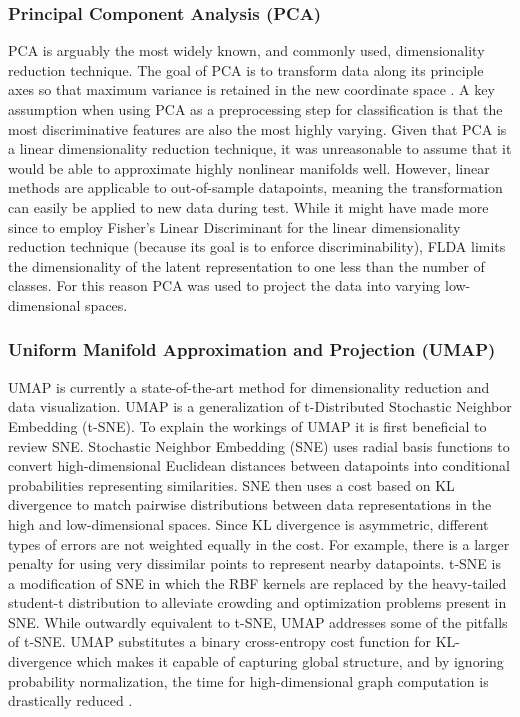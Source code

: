\documentclass[conference]{IEEEtran}
\begin{document}
	\subsubsection*{Principal Component Analysis (PCA)}  PCA is arguably the most widely known, and commonly used, dimensionality reduction technique.  The goal of PCA is to transform data along its principle axes so that maximum variance is retained in the new coordinate space \cite{Tipping1999PPCA,Murphy2012Textbook}.  A key assumption when using PCA as a preprocessing step for classification is that the most discriminative features are also the most highly varying. Given that PCA is a linear dimensionality reduction technique, it was unreasonable to assume that it would be able to approximate highly nonlinear manifolds well.   However, linear methods are applicable to out-of-sample datapoints, meaning the transformation can easily be applied to new data during test. While it might have made more since to employ Fisher's Linear Discriminant for the linear dimensionality reduction technique (because its goal is to enforce discriminability), FLDA limits the dimensionality of the latent representation to one less than the number of classes.  For this reason PCA was used to project the data into varying low-dimensional spaces.
	
	\subsubsection*{Uniform Manifold Approximation and Projection (UMAP)} UMAP is currently a state-of-the-art method for dimensionality reduction and data visualization.  UMAP is a generalization of t-Distributed Stochastic Neighbor Embedding (t-SNE).  To explain the workings of UMAP it is first beneficial to review SNE. Stochastic Neighbor Embedding (SNE) uses radial basis functions  to convert high-dimensional Euclidean distances between datapoints into conditional probabilities representing similarities.  SNE then uses a cost based on KL divergence to match pairwise distributions between data representations in the high and low-dimensional spaces.  Since KL divergence is asymmetric, different types of errors are not weighted equally in the cost.  For example, there is a larger penalty for using very dissimilar points to represent nearby datapoints.  t-SNE is a modification of SNE in which the RBF kernels are replaced by the heavy-tailed student-t distribution \cite{vanDerMaaten2008tSNE} to alleviate crowding and optimization problems present in SNE.   While outwardly equivalent to t-SNE, UMAP addresses some of the pitfalls of t-SNE.  UMAP substitutes a binary cross-entropy cost function for KL-divergence which makes it capable of capturing global structure, and by ignoring probability normalization, the time for high-dimensional graph computation is drastically reduced \cite{McInnes2018UMAP}.
\end{document}

